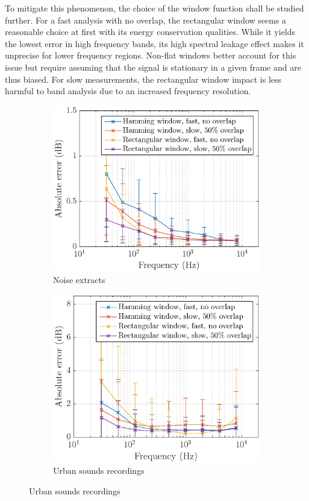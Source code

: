 \documentclass[final,3p,times,twocolumn]{elsarticle}
\begin{document}
To mitigate this phenomenon, the choice of the window function shall be studied further. For a fast analysis with no overlap, the rectangular window seems a reasonable choice at first with its energy conservation qualities. While it yields the lowest error in high frequency bands, its high spectral leakage effect makes it unprecise for lower frequency regions. Non-flat windows better account for this issue but require assuming that the signal is stationary in a given frame and are thus biased. For slow measurements, the rectangular window impact is less harmful to band analysis due to an increased frequency resolution.\\

\begin{figure}[h!]
    \centering
    \begin{subfigure}[h]{0.45\textwidth}
        \centering
        \includegraphics[width=\linewidth]{figures/err_m_n.eps}
        \caption{Noise extracts}
    \end{subfigure}
    \hfill
    \begin{subfigure}[h]{0.45\textwidth}
        \centering
        \includegraphics[width=\linewidth]{figures/err_m_u.eps}
        \caption{Urban sounds recordings}
    \end{subfigure}


\end{figure}
\end{document}
